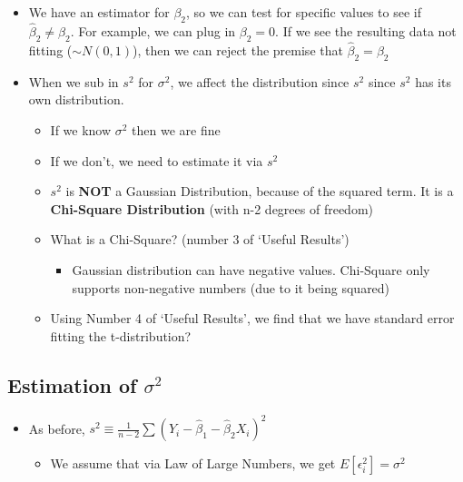 \documentclass[10pt, oneside]{article}
\begin{document}
\begin{itemize}
\begin{itemize}
        \item We have an estimator for $\beta_2$, so we can test for specific values to see if $\hat \beta_2 \neq \beta_2$. For example, we can plug in $\beta_2 = 0$. If we see the resulting data not fitting ($\sim N(0,1)$), then we can reject the premise that $\hat \beta_2 = \beta_2$
        \item When we sub in $s^2$ for $\sigma^2$, we affect the distribution since $s^2$ since $s^2$ has its own distribution.
        \begin{itemize}
            \item If we know $\sigma^2$ then we are fine
            \item If we don't, we need to estimate it via $s^2$
            \item $s^2$ is \textbf{NOT} a Gaussian Distribution, because of the squared term. It is a \textbf{Chi-Square Distribution} (with n-2 degrees of freedom)
            \item What is a Chi-Square? (number 3 of `Useful Results')
            \begin{itemize}
                \item Gaussian distribution can have negative values. Chi-Square only supports non-negative numbers (due to it being squared)
            \end{itemize}
            \item Using Number 4 of `Useful Results', we find that we have standard error fitting the t-distribution?
        \end{itemize}
    \end{itemize}
\end{itemize}

\subsection{Estimation of $\sigma^2$}
\begin{itemize}
    \item As before, $s^2 \equiv \frac{1}{n-2} \sum (Y_i -\hat \beta_1 -\hat \beta_2 X_i)^2$
    \begin{itemize}
        \item We assume that via Law of Large Numbers, we get $E[\epsilon_i^2] = \sigma^2$
    \end{itemize}
\end{itemize}
\end{document}

